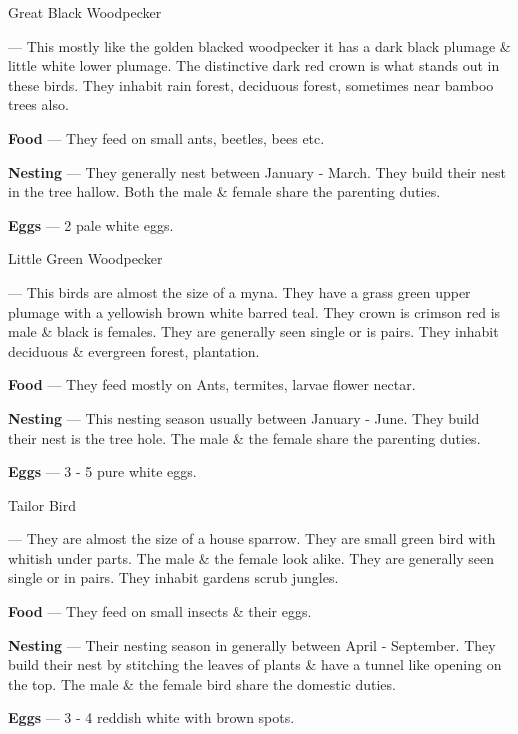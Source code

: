 \begin{bird}{Great Black Woodpecker}

 --- This mostly like the golden blacked woodpecker it has a dark black plumage \& little white lower plumage. The distinctive dark red crown is what stands out in these birds. They  inhabit rain forest, deciduous forest, sometimes near bamboo trees also.

{\large\bf Food} --- They feed on small ants, beetles, bees etc.

{\large\bf Nesting} --- They generally nest between January - March. They build their nest in the tree hallow. Both the male \& female share the parenting duties.

{\large\bf Eggs} --- 2 pale white eggs.
\end{bird}

\begin{bird}{Little Green Woodpecker}

 --- This birds are almost the size of a myna. They have a grass green upper plumage with a yellowish brown white barred teal. They crown is crimson red is male \& black is females. They are generally seen single or is pairs. They inhabit deciduous \& evergreen forest, plantation.

{\large\bf Food} --- They feed mostly on Ants, termites, larvae flower nectar.

{\large\bf Nesting} --- This nesting season usually between January - June. They  build their nest is the tree hole. The male \& the female share the parenting duties.

{\large\bf Eggs} --- 3 - 5 pure white eggs.
\end{bird}

\begin{bird}{Tailor Bird}

 --- They are almost the size of a house sparrow. They are small green bird with whitish under parts. The male \& the female look alike. They are generally seen single or in pairs. They inhabit gardens scrub jungles.

{\large\bf Food} --- They feed on small insects \& their eggs.

{\large\bf Nesting} --- Their nesting season in generally between April - September. They build their nest by stitching the leaves of plants \& have a tunnel like opening on the top. The male \& the female bird share the domestic duties.

{\large\bf Eggs} --- 3 - 4 reddish white with brown spots.
\end{bird}

